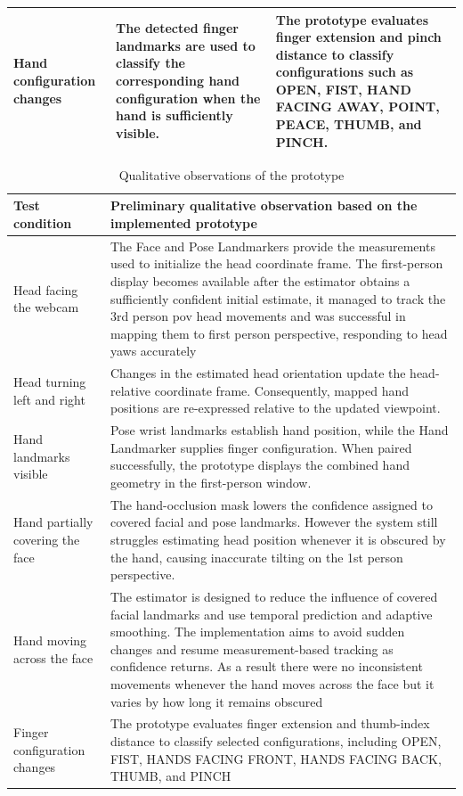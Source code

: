 \documentclass[12pt,a4paper]{article}
\begin{document}
\begin{table}[h!]
\begin{tabular}{>{\raggedright\arraybackslash}p{3.0cm} >{\raggedright\arraybackslash}p{5.3cm} >{\raggedright\arraybackslash}p{6.1cm}}
        Hand configuration changes & The detected finger landmarks are used to classify the corresponding hand configuration when the hand is sufficiently visible. & The prototype evaluates finger extension and pinch distance to classify configurations such as OPEN, FIST, HAND FACING AWAY, POINT, PEACE, THUMB, and PINCH.\\
        \bottomrule
        \end{tabular}
\end{table}

\begin{table}[h!]
    \centering
    \caption{Qualitative observations of the prototype}
    \label{tab:observations}
    \small
    \begin{tabular}{>{\raggedright\arraybackslash}p{4cm} >{\raggedright\arraybackslash}p{9cm}}
        \toprule
        Test condition & Preliminary qualitative observation based on the implemented prototype \\
        \midrule
        Head facing the webcam & The Face and Pose Landmarkers provide the measurements used to initialize the head coordinate frame. The first-person display becomes available after the estimator obtains a sufficiently confident initial estimate, it managed to track the 3rd person pov head movements and was successful in mapping them to first person perspective, responding to head yaws accurately\\
        Head turning left and right & Changes in the estimated head orientation update the head-relative coordinate frame. Consequently, mapped hand positions are re-expressed relative to the updated viewpoint. \\
        Hand landmarks visible & Pose wrist landmarks establish hand position, while the Hand Landmarker supplies finger configuration. When paired successfully, the prototype displays the combined hand geometry in the first-person window. \\
        Hand partially covering the face & The hand-occlusion mask lowers the confidence assigned to covered facial and pose landmarks. However the system still struggles estimating head position whenever it is obscured by the hand, causing inaccurate tilting on the 1st person perspective. \\
        Hand moving across the face & The estimator is designed to reduce the influence of covered facial landmarks and use temporal prediction and adaptive smoothing. The implementation aims to avoid sudden changes and resume measurement-based tracking as confidence returns.
        As a result there were no inconsistent movements whenever the hand moves across the face but it varies by how long it remains obscured\\
        Finger configuration changes & The prototype evaluates finger extension and thumb-index distance to classify selected configurations, including OPEN, FIST, HANDS FACING FRONT, HANDS FACING BACK, THUMB, and PINCH \\
        \bottomrule
        \end{tabular}
\end{table}
\end{document}
